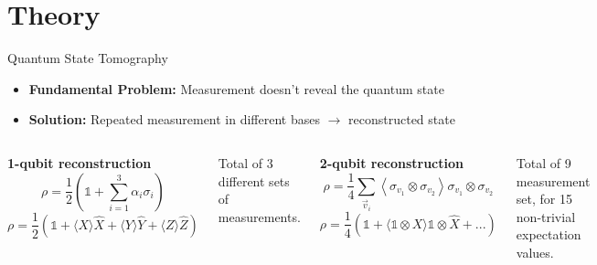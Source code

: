 \section{Theory}

\begin{frame}{Quantum State Tomography}
  \begin{itemize}
  \item \textbf{Fundamental Problem:} Measurement doesn't reveal the quantum state
  \item \textbf{Solution:} Repeated measurement in different bases $\rightarrow$
      reconstructed state
  \end{itemize}
  \vspace{0.5cm}

  \begin{columns}
    \centering \textbf{1-qubit reconstruction}
      \begin{equation*}
        \rho=\frac{1}{2}\left(\mathbb{1}+\sum_{i=1}^3\alpha_i\sigma_i\right)
      \end{equation*}
      \begin{equation*}
        \rho=\frac{1}{2}\left(\mathbb{1}
          + \langle X \rangle \hat{X}
          + \langle Y \rangle \hat{Y}
          + \langle Z \rangle \hat{Z} \right)
      \end{equation*}

      \vspace{0.7cm}
      Total of 3 different sets of measurements.

    \centering \textbf{2-qubit reconstruction}
    \begin{equation*}
      \rho=\frac{1}{4}\sum_{\vec{v}_i}\left\langle\sigma_{v_1}
        \otimes\sigma_{v_2}\right\rangle\sigma_{v_1}\otimes\sigma_{v_2} 
    \end{equation*}
    \begin{equation*}
      \rho=\frac{1}{4}\left(\mathbb{1}
        + \langle \mathbb{1} \otimes X \rangle \mathbb{1} \otimes \hat{X} + ...\right)
    \end{equation*}

    \vspace{0.7cm}
    Total of 9 measurement set, for 15 non-trivial expectation values.

  \end{columns} 
\end{frame}


